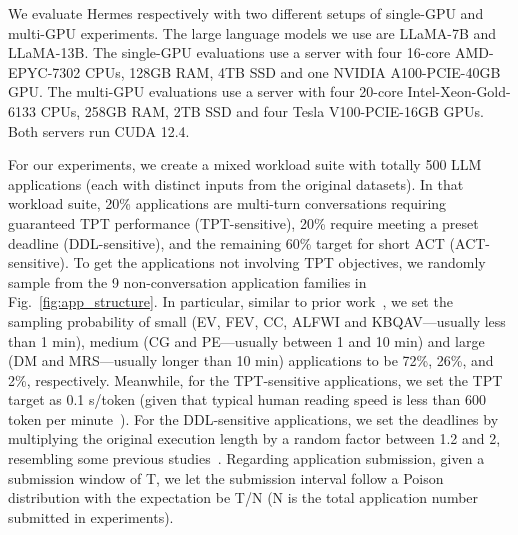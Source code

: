 We evaluate Hermes respectively with two different setups of single-GPU and multi-GPU experiments.
The large language models we use are LLaMA-7B and LLaMA-13B.
The single-GPU evaluations use a server with four 16-core AMD-EPYC-7302 CPUs, 128GB RAM, 4TB SSD and one NVIDIA A100-PCIE-40GB GPU. 
The multi-GPU evaluations use a server with four 20-core Intel-Xeon-Gold-6133 CPUs, 258GB RAM, 2TB SSD and four Tesla V100-PCIE-16GB GPUs. 
Both servers run CUDA 12.4.


For our experiments, we create a mixed workload suite with totally 500 LLM applications (each with distinct inputs from the original datasets). %
In that workload suite, 20\% applications are multi-turn conversations requiring guaranteed TPT performance (TPT-sensitive), 20\% require meeting a preset deadline (DDL-sensitive), and the remaining 60\% target for short ACT (ACT-sensitive). 
To get the applications not involving TPT objectives, we randomly sample from the 9 non-conversation application families in Fig.~\ref{fig:app_structure}.
In particular, similar to prior work~\cite{qiao2021pollux, jayaram2023sia, zheng2023shockwave}, we set the sampling probability of small (EV, FEV, CC, ALFWI and KBQAV---usually less than 1 min), medium (CG and PE---usually between 1 and 10 min) and large (DM and MRS---usually longer than 10 min) applications to be 72\%, 26\%, and 2\%, respectively.
Meanwhile, for the TPT-sensitive applications, we set the TPT target as 0.1 s/token (given that typical human reading speed is less than 600 token per minute~\cite{reading_speed}).
For the DDL-sensitive applications, we set the deadlines by multiplying the original execution length by a random factor between 1.2 and 2, resembling some previous studies~\cite{narayanan2020heterogeneity, gu2023elasticflow}.
Regarding application submission, given a submission window of T, we let the submission interval follow a Poison distribution with the expectation be T/N (N is the total application number submitted in experiments). 

